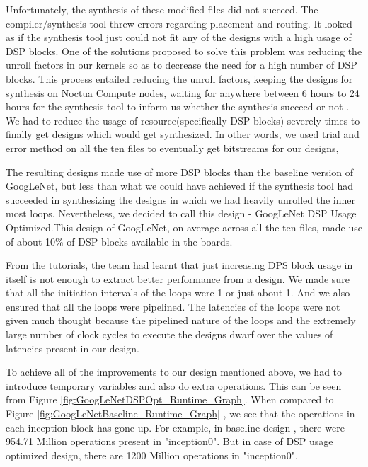 Unfortunately, the synthesis of these modified files did not succeed. The compiler/synthesis tool threw errors regarding placement and routing. It looked as if the synthesis tool just could not fit any of the designs with a high usage of DSP blocks.   
One of the solutions proposed to solve this problem was reducing the unroll factors in our kernels so as to decrease the need for a high number of DSP blocks. This process entailed reducing the unroll factors, keeping the designs for synthesis on Noctua Compute nodes, waiting for anywhere between 6 hours to 24 hours for the synthesis tool to inform us whether the synthesis succeed or not . We had to reduce the usage of resource(specifically DSP blocks) severely times to finally get designs  which would get synthesized. In other words, we used trial and error method on all the ten files to eventually get bitstreams for our designs,  

The resulting designs made use of more DSP blocks than the baseline version of GoogLeNet, but less than what we could have achieved if the synthesis tool had succeeded in synthesizing the designs in which we had heavily unrolled the inner most loops. Nevertheless, we decided to call this design - GoogLeNet DSP Usage Optimized.This design of GoogLeNet, on average across all the ten files, made use of about 10\% of DSP blocks available in the boards.

From the tutorials, the team had learnt that just increasing DPS block usage in itself is not enough to extract better performance from a design. We made sure that all the initiation intervals of the loops were 1 or just about 1. And we also ensured that all the loops were pipelined. The latencies of the loops were not given much thought because the pipelined nature of the loops and the extremely large number of clock cycles to execute the designs dwarf over the values of latencies present in our design.   

To achieve all of the improvements to our design mentioned above, we had to introduce temporary variables and  also do extra operations. This can be seen from Figure \ref{fig:GoogLeNetDSPOpt_Runtime_Graph}. When compared to Figure \ref{fig:GoogLeNetBaseline_Runtime_Graph} , we see that the operations in each inception block has gone up. For example, in baseline design , there were 954.71 Million operations present in "inception0". But in case of DSP usage optimized design, there are 1200 Million operations in "inception0". 

